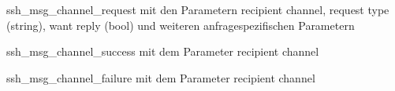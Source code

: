 \documentclass[a4paper]{article}
\begin{document}
\begin{multicols}{3}
\begin{itemize*}
            \begin{description*}
                  \item[ssh\_msg\_channel\_request] mit den Parametern recipient channel, request type (string), want reply (bool) und weiteren anfragespezifischen Parametern
                  \item[ssh\_msg\_channel\_success] mit dem Parameter recipient channel
                  \item[ssh\_msg\_channel\_failure] mit dem Parameter recipient channel
            \end{description*}

\end{itemize*}
\end{multicols}
\end{document}
